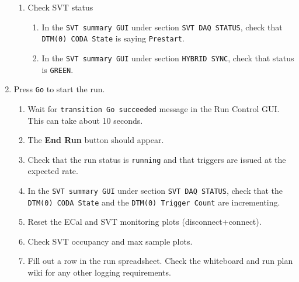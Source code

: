 \documentclass[12pt]{article}
\begin{document}
\begin{enumerate}
\begin{enumerate}
\item Check SVT status
\begin{enumerate}
\item In the \texttt{SVT summary GUI} under section \texttt{SVT DAQ STATUS}, check that \texttt{DTM(0) CODA State} is saying \texttt{Prestart}.
\item In the \texttt{SVT summary GUI} under section \texttt{HYBRID SYNC}, check that status is \texttt{GREEN}.
\end{enumerate}

\end{enumerate}




\item
\label{item:go}
Press \texttt{Go} to start the run. 

\begin{enumerate}

\item Wait for \texttt{transition Go succeeded} message in the Run Control GUI. This can take about 10 seconds.
\item The \textbf{End Run} button should appear.

\item Check that the run status is \texttt{running} and that triggers are issued at the expected rate.

\item In the \texttt{SVT summary GUI} under section \texttt{SVT DAQ STATUS}, check that the \texttt{DTM(0) CODA State} and the \texttt{DTM(0) Trigger Count} are incrementing.

\item Reset the ECal and SVT monitoring plots (disconnect+connect). 

\item Check SVT occupancy and max sample plots.

\item Fill out a row in the run spreadsheet. Check the whiteboard and run plan wiki for any other logging requirements.

\end{enumerate}
\end{enumerate}
\end{document}
